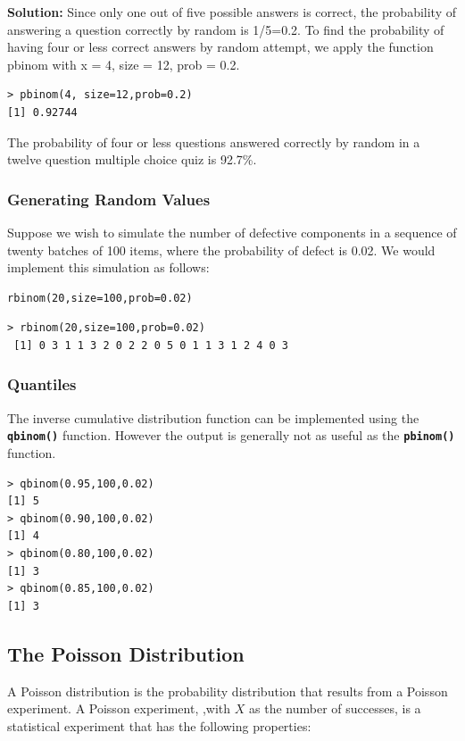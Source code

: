 \documentclass[a4paper,12pt]{article}
\begin{document}
\textbf{Solution:} Since only one out of five possible answers is correct, the probability of answering a question correctly by random is 1/5=0.2. To find the probability of having four or less correct answers by random attempt, we apply the function pbinom with x = 4, size = 12, prob = 0.2. 

\begin{verbatim}
> pbinom(4, size=12,prob=0.2) 
[1] 0.92744 
\end{verbatim}

The probability of four or less questions answered correctly by random in a twelve question multiple choice quiz is 92.7\%. 
 
\subsubsection{Generating Random Values}

Suppose we wish to simulate the number of defective components in a sequence of twenty batches of 100 items, where the probability of defect is 0.02. We would implement this simulation as follows:


\begin{verbatim}
rbinom(20,size=100,prob=0.02)
\end{verbatim}


\begin{verbatim}
> rbinom(20,size=100,prob=0.02)
 [1] 0 3 1 1 3 2 0 2 2 0 5 0 1 1 3 1 2 4 0 3
\end{verbatim}
\subsubsection{Quantiles}
The inverse cumulative distribution function can be implemented using the \texttt{\textbf{qbinom()}} function.
However the output is generally not as useful as the \texttt{\textbf{pbinom()}} function.
\begin{verbatim}
> qbinom(0.95,100,0.02)
[1] 5
> qbinom(0.90,100,0.02)
[1] 4
> qbinom(0.80,100,0.02)
[1] 3
> qbinom(0.85,100,0.02)
[1] 3
\end{verbatim}


\subsection{The Poisson Distribution}

A Poisson distribution is the probability distribution that results from a Poisson experiment. A Poisson experiment, ,with $X$ as the number of successes, is a statistical experiment that has the following properties: 
\end{document}
